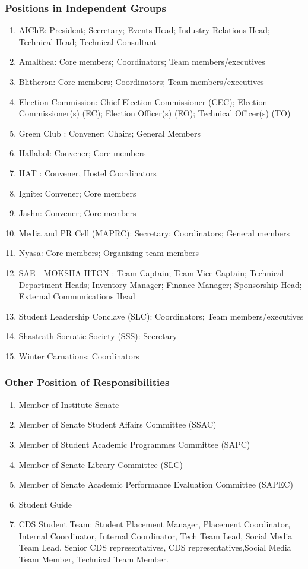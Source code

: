 \documentclass[12pt]{article}
\begin{document}
\subsubsection{Positions in Independent Groups}
\begin{enumerate}
    \item AIChE: President; Secretary; Events Head; Industry Relations Head; Technical Head; Technical Consultant
    \item Amalthea: Core members; Coordinators; Team members/executives
    \item Blithcron: Core members; Coordinators; Team members/executives
    \item Election Commission: Chief Election Commissioner (CEC); Election Commissioner(s) (EC); Election Officer(s) (EO); Technical Officer(s) (TO)
    \item Green Club : Convener; Chairs; General Members
    \item Hallabol: Convener; Core members
    \item HAT : Convener, Hostel Coordinators
    \item Ignite: Convener; Core members
    \item Jashn: Convener; Core members
    \item Media and PR Cell (MAPRC): Secretary; Coordinators; General members
    \item Nyasa: Core members; Organizing team members
    \item SAE - MOKSHA IITGN : Team Captain; Team Vice Captain; Technical Department Heads; Inventory Manager; Finance Manager; Sponsorship Head; External Communications Head
    \item Student Leadership Conclave (SLC): Coordinators; Team members/executives
    \item Shastrath Socratic Society (SSS): Secretary
    \item Winter Carnations: Coordinators
\end{enumerate}


\subsubsection{Other Position of Responsibilities}
\begin{enumerate}
    \item Member of Institute Senate
    \item Member of Senate Student Affairs Committee (SSAC)
    \item Member of Student Academic Programmes Committee (SAPC)
    \item Member of Senate Library Committee (SLC)
    \item Member of Senate Academic Performance Evaluation Committee (SAPEC)
    \item Student Guide
    \item CDS Student Team: Student Placement Manager, Placement Coordinator, Internal Coordinator, Internal Coordinator, Tech Team Lead, Social Media Team Lead, Senior CDS representatives, CDS representatives,Social Media Team Member, Technical Team Member.
\end{enumerate}
\end{document}
